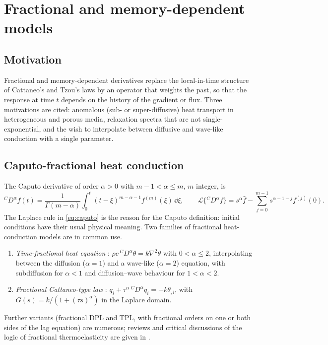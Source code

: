 \section{Fractional and memory-dependent models}\label{sec:memory}
\subsection{Motivation}
Fractional and memory-dependent derivatives replace the local-in-time structure of Cattaneo's and Tzou's laws by an operator that weights the past, so that the response at time $t$ depends on the history of the gradient or flux. Three motivations are cited: anomalous (sub- or super-diffusive) heat transport in heterogeneous and porous media, relaxation spectra that are not single-exponential, and the wish to interpolate between diffusive and wave-like conduction with a single parameter.

\subsection{Caputo-fractional heat conduction}
The Caputo derivative of order $\alpha>0$ with $m-1<\alpha\le m$, $m$ integer, is \citep{Caputo1967,Podlubny1999}
\begin{equation}
{}^C\!D^\alpha f(t)=\frac1{\Gamma(m-\alpha)}\int_0^t(t-\xi)^{m-\alpha-1}f^{(m)}(\xi)\,\dd\xi,\qquad
\mathcal L\{{}^C\!D^\alpha f\}=s^\alpha\hat f-\sum_{j=0}^{m-1}s^{\alpha-1-j}f^{(j)}(0).\label{eq:caputo}
\end{equation}
The Laplace rule in \eqref{eq:caputo} is the reason for the Caputo definition: initial conditions have their usual physical meaning. Two families of fractional heat-conduction models are in common use.
\begin{enumerate}
\item \emph{Time-fractional heat equation} \citep{Povstenko2004,Povstenko2007,Povstenko2009}: $\rho c\,{}^C\!D^\alpha\theta=k\nabla^2\theta$ with $0<\alpha\le2$, interpolating between the diffusion ($\alpha=1$) and a wave-like ($\alpha=2$) equation, with subdiffusion for $\alpha<1$ and diffusion--wave behaviour for $1<\alpha<2$.
\item \emph{Fractional Cattaneo-type law} \citep{Povstenko2011Cattaneo,Sherief2010Fractional,Ezzat2011}: $q_i+\tau^\alpha\,{}^C\!D^\alpha q_i=-k\theta_{,i}$, with $G(s)=k/(1+(\tau s)^\alpha)$ in the Laplace domain.
\end{enumerate}
Further variants (fractional DPL and TPL, with fractional orders on one or both sides of the lag equation) are numerous; reviews and critical discussions of the logic of fractional thermoelasticity are given in \citep{Povstenko2016,Yu2024,Gorenflo1997,Povstenko2004,Povstenko2007,Povstenko2009}.

